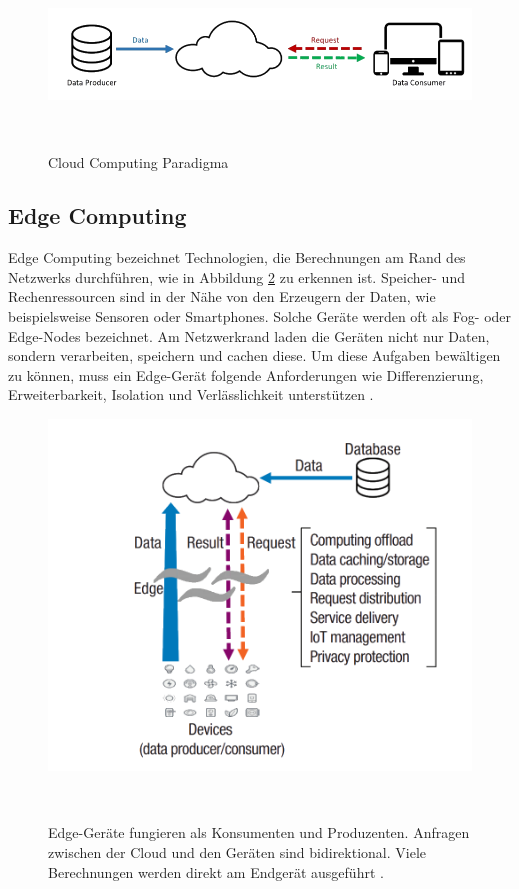 \documentclass{sigchi}
\begin{document}
\begin{figure}
\centering
  \includegraphics[width=0.75\columnwidth]{figures/cloud-computing-structure.PNG}
  \caption{Cloud Computing Paradigma \cite{vision-challenges:2016}}~\label{fig:cloud-computing}
\end{figure}

\subsection{Edge Computing}
Edge Computing bezeichnet Technologien, die Berechnungen am Rand des Netzwerks durchführen, wie in Abbildung \ref{fig:edge-computing} zu erkennen ist. Speicher- und Rechenressourcen sind in der Nähe von den Erzeugern der Daten, wie beispielsweise Sensoren oder Smartphones. Solche Geräte werden oft als Fog- oder Edge-Nodes bezeichnet. Am Netzwerkrand laden die Geräten nicht nur Daten, sondern verarbeiten, speichern und cachen diese. Um diese Aufgaben bewältigen zu können, muss ein Edge-Gerät folgende Anforderungen wie Differenzierung, Erweiterbarkeit, Isolation und Verlässlichkeit unterstützen \cite{promise-edge-computing:2016}.

\begin{figure}
\centering
  \includegraphics[width=0.75\columnwidth]{figures/edge-computing-structure.PNG}
  \caption{Edge-Geräte fungieren als Konsumenten und Produzenten. Anfragen zwischen der Cloud und den Geräten sind bidirektional. Viele Berechnungen werden direkt am Endgerät ausgeführt \cite{promise-edge-computing:2016}.}~\label{fig:edge-computing}
\end{figure}
\end{document}
